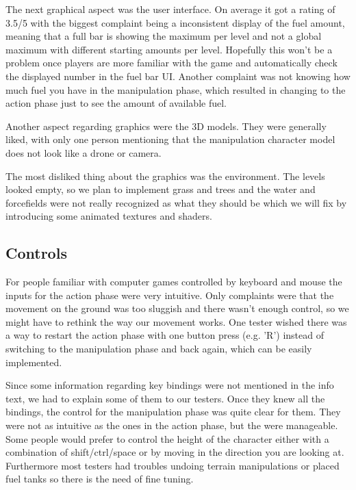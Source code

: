 \documentclass[12pt, letterpaper]{scrartcl}
\begin{document}
	 The next graphical aspect was the user interface. On average it got a rating of 3.5/5 with the biggest complaint being a inconsistent display of the fuel amount, meaning that a full bar is showing the maximum per level and not a global maximum with different starting amounts per level. Hopefully this won't be a problem once players are more familiar with the game and automatically check the displayed number in the fuel bar UI. Another complaint was not knowing how much fuel you have in the manipulation phase, which resulted in changing to the action phase just to see the amount of available fuel.
	 
	 Another aspect regarding graphics were the 3D models. They were generally liked, with only one person mentioning that the manipulation character model does not look like a drone or camera. 
	 
	 The most disliked thing about the graphics was the environment. The levels looked empty, so we plan to implement grass and trees and the water and forcefields were not really recognized as what they should be which we will fix by introducing some animated textures and shaders.
	 
	 \subsection{Controls}
	 For people familiar with computer games controlled by keyboard and mouse the inputs for the action phase were very intuitive. Only complaints were that the movement on the ground was too sluggish and there wasn't enough control, so we might have to rethink the way our movement works. One tester wished there was a way to restart the action phase with one button press (e.g. 'R') instead of switching to the manipulation phase and back again, which can be easily implemented.
	 
	 Since some information regarding key bindings were not mentioned in the info text, we had to explain some of them to our testers. Once they knew all the bindings, the control for the manipulation phase was quite clear for them. They were not as intuitive as the ones in the action phase, but the were manageable. Some people would prefer to control the height of the character either with a combination of shift/ctrl/space or by moving in the direction you are looking at. Furthermore most testers had troubles undoing terrain manipulations or placed fuel tanks so there is the need of fine tuning.
	 
\end{document}
